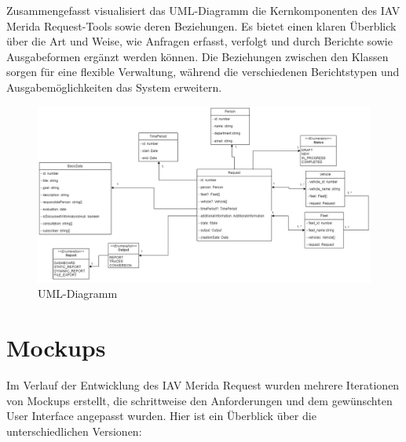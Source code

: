 Zusammengefasst visualisiert das UML-Diagramm die Kernkomponenten des IAV Merida Request-Tools sowie deren Beziehungen. Es bietet einen klaren Überblick über die Art und Weise, wie Anfragen erfasst, verfolgt und durch Berichte sowie Ausgabeformen ergänzt werden können. Die Beziehungen zwischen den Klassen sorgen für eine flexible Verwaltung, während die verschiedenen Berichtstypen und Ausgabemöglichkeiten das System erweitern.
\begin{figure}[H]
    \centering
    \includegraphics[angle=90, scale=.45]{media/UML_Diagramm}
    \caption{UML-Diagramm}
    \label{fig:UML_Diagramm}
\end{figure}
\newpage
\section{Mockups}
Im Verlauf der Entwicklung des IAV Merida Request wurden mehrere Iterationen von Mockups erstellt, die schrittweise den Anforderungen und dem gewünschten User Interface angepasst wurden. Hier ist ein Überblick über die unterschiedlichen Versionen:
